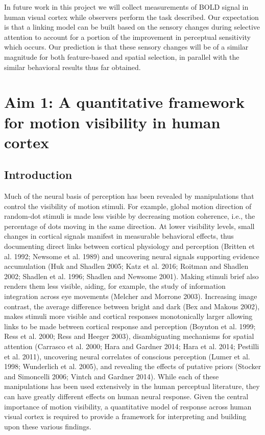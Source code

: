 \documentclass{report}
\begin{document}
In future work in this project we will collect measurements of BOLD signal in human visual cortex while observers perform the task described. Our expectation is that a linking model can be built based on the sensory changes during selective attention to account for a portion of the improvement in perceptual sensitivity which occurs. Our prediction is that these sensory changes will be of a similar magnitude for both feature-based and spatial selection, in parallel with the similar behavioral results thus far obtained.

\chapter{Aim 1: A quantitative framework for motion visibility in human cortex}
\section{Introduction}
Much of the neural basis of perception has been revealed by manipulations that control the visibility of motion stimuli. For example, global motion direction of random-dot stimuli is made less visible by decreasing motion coherence, i.e., the percentage of dots moving in the same direction. At lower visibility levels, small changes in cortical signals manifest in measurable behavioral effects, thus documenting direct links between cortical physiology and perception (Britten et al. 1992; Newsome et al. 1989) and uncovering neural signals supporting evidence accumulation (Huk and Shadlen 2005; Katz et al. 2016; Roitman and Shadlen 2002; Shadlen et al. 1996; Shadlen and Newsome 2001). Making stimuli brief also renders them less visible, aiding, for example, the study of information integration across eye movements (Melcher and Morrone 2003). Increasing image contrast, the average difference between bright and dark (Bex and Makous 2002), makes stimuli more visible and cortical responses monotonically larger allowing links to be made between cortical response and perception (Boynton et al. 1999; Ress et al. 2000; Ress and Heeger 2003), disambiguating mechanisms for spatial attention (Carrasco et al. 2000; Hara and Gardner 2014; Hara et al. 2014; Pestilli et al. 2011), uncovering neural correlates of conscious perception (Lumer et al. 1998; Wunderlich et al. 2005), and revealing the effects of putative priors (Stocker and Simoncelli 2006; Vintch and Gardner 2014). While each of these manipulations has been used extensively in the human perceptual literature, they can have greatly different effects on human neural response. Given the central importance of motion visibility, a quantitative model of response across human visual cortex is required to provide a framework for interpreting and building upon these various findings.
\end{document}
